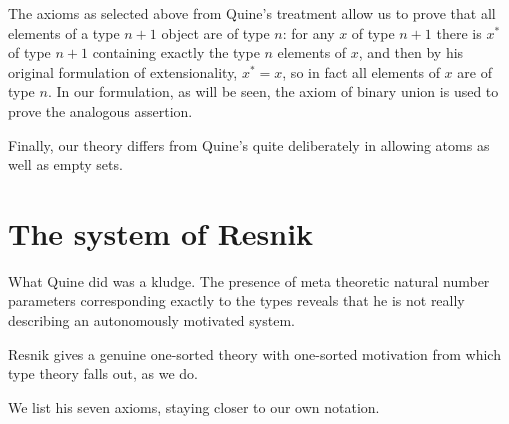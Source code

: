 \documentclass[12pt]{article}
\begin{document}
The axioms as selected above from Quine's treatment allow us to prove that
all elements of a type $n+1$ object are of type $n$:  for any $x$ of type $n+1$ there
is $x^*$ of type $n+1$ containing exactly the type $n$ elements of $x$, and then by his original formulation of extensionality, $x^*=x$, so in fact all elements of $x$ are of type $n$.  In our formulation, as will be seen, the axiom of binary union is used to prove the analogous assertion.

Finally, our theory differs from Quine's quite deliberately in allowing atoms as well as empty sets.

\section{The system of Resnik}

What Quine did was a kludge.  The presence of meta theoretic natural number parameters corresponding exactly to the types
reveals that he is not really describing an autonomously motivated system.

Resnik gives a genuine one-sorted theory with one-sorted motivation from which type theory falls out, as we do.

We list his seven axioms, staying closer to our own notation.
\end{document}
